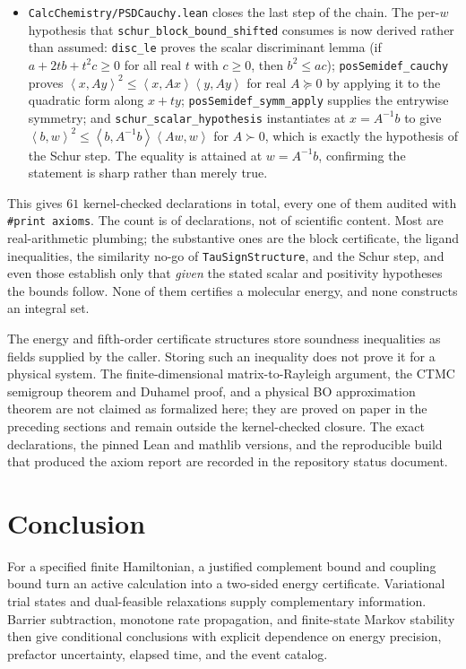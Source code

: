\documentclass[11pt,a4paper]{article}
\theoremstyle{plain}
\theoremstyle{definition}
\theoremstyle{remark}
\newcommand{\ip}[2]{\left\langle #1,#2\right\rangle}
\providecommand{\path}[1]{\texttt{#1}}
\begin{document}
\begin{sloppypar}
\begin{itemize}
\item \path{CalcChemistry/PSDCauchy.lean} closes the last step of the chain. The
per-$w$ hypothesis that \path{schur_block_bound_shifted} consumes is now derived
rather than assumed:
\path{disc_le} proves the scalar discriminant lemma (if $a+2tb+t^2c\ge0$ for all
real $t$ with $c\ge0$, then $b^2\le ac$);
\path{posSemidef_cauchy} proves $\ip{x}{Ay}^2\le\ip{x}{Ax}\ip{y}{Ay}$ for real
$A\succeq0$ by applying it to the quadratic form along $x+ty$;
\path{posSemidef_symm_apply} supplies the entrywise symmetry;
and \path{schur_scalar_hypothesis} instantiates at $x=A^{-1}b$ to give
$\ip{b}{w}^2\le\ip{b}{A^{-1}b}\ip{Aw}{w}$ for $A\succ0$, which is exactly the
hypothesis of the Schur step. The equality is attained at $w=A^{-1}b$, confirming
the statement is sharp rather than merely true.
\end{itemize}
\end{sloppypar}

This gives $61$ kernel-checked declarations in total, every one of them
audited with \texttt{\#print axioms}. The count is of declarations, not of
scientific content. Most are real-arithmetic plumbing; the substantive ones are
the block certificate, the ligand inequalities, the similarity no-go of
\path{TauSignStructure}, and the Schur step, and even those establish only that
\emph{given} the stated scalar and positivity hypotheses the bounds follow. None of
them certifies a molecular energy, and none constructs an integral set.

The energy and fifth-order certificate structures store soundness inequalities
as fields supplied by the caller. Storing such an inequality does not prove
it for a physical system. The finite-dimensional matrix-to-Rayleigh argument,
the CTMC semigroup theorem and Duhamel proof, and a physical BO approximation
theorem are not claimed as formalized here; they are proved on paper in the
preceding sections and remain outside the kernel-checked closure. The exact
declarations, the pinned Lean and mathlib versions, and the reproducible build
that produced the axiom report are recorded in the repository status document.

\section{Conclusion}
For a specified finite Hamiltonian, a justified complement bound and coupling
bound turn an active calculation into a two-sided energy certificate.
Variational trial states and dual-feasible relaxations supply complementary
information. Barrier subtraction, monotone rate propagation, and finite-state
Markov stability then give conditional conclusions with explicit dependence on
energy precision, prefactor uncertainty, elapsed time, and the event catalog.
\end{document}
